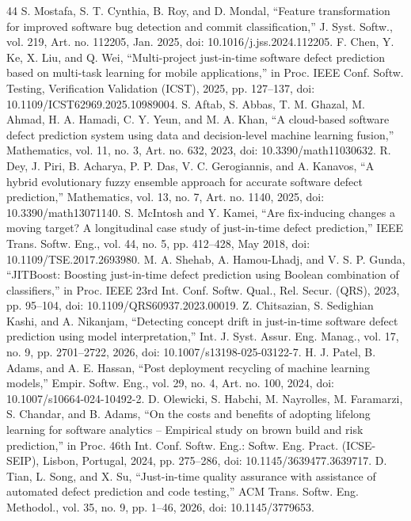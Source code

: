 \begin{thebibliography}{44}
 S. Mostafa, S. T. Cynthia, B. Roy, and D. Mondal, ``Feature transformation for improved software bug detection and commit classification,'' J. Syst. Softw., vol. 219, Art. no. 112205, Jan. 2025, doi: \mbox{10.1016/j.jss.2024.112205}.
 F. Chen, Y. Ke, X. Liu, and Q. Wei, ``Multi-project just-in-time software defect prediction based on multi-task learning for mobile applications,'' in Proc. IEEE Conf. Softw. Testing, Verification Validation (ICST), 2025, pp. 127--137, doi: \mbox{10.1109/ICST62969.2025.10989004}.
 S. Aftab, S. Abbas, T. M. Ghazal, M. Ahmad, H. A. Hamadi, C. Y. Yeun, and M. A. Khan, ``A cloud-based software defect prediction system using data and decision-level machine learning fusion,'' Mathematics, vol. 11, no. 3, Art. no. 632, 2023, doi: \mbox{10.3390/math11030632}.
 R. Dey, J. Piri, B. Acharya, P. P. Das, V. C. Gerogiannis, and A. Kanavos, ``A hybrid evolutionary fuzzy ensemble approach for accurate software defect prediction,'' Mathematics, vol. 13, no. 7, Art. no. 1140, 2025, doi: \mbox{10.3390/math13071140}.
 S. McIntosh and Y. Kamei, ``Are fix-inducing changes a moving target? A longitudinal case study of just-in-time defect prediction,'' IEEE Trans. Softw. Eng., vol. 44, no. 5, pp. 412--428, May 2018, doi: \mbox{10.1109/TSE.2017.2693980}.
 M. A. Shehab, A. Hamou-Lhadj, and V. S. P. Gunda, ``JITBoost: Boosting just-in-time defect prediction using Boolean combination of classifiers,'' in Proc. IEEE 23rd Int. Conf. Softw. Qual., Rel. Secur. (QRS), 2023, pp. 95--104, doi: \mbox{10.1109/QRS60937.2023.00019}.
 Z. Chitsazian, S. Sedighian Kashi, and A. Nikanjam, ``Detecting concept drift in just-in-time software defect prediction using model interpretation,'' Int. J. Syst. Assur. Eng. Manag., vol. 17, no. 9, pp. 2701--2722, 2026, doi: \mbox{10.1007/s13198-025-03122-7}.
 H. J. Patel, B. Adams, and A. E. Hassan, ``Post deployment recycling of machine learning models,'' Empir. Softw. Eng., vol. 29, no. 4, Art. no. 100, 2024, doi: \mbox{10.1007/s10664-024-10492-2}.
 D. Olewicki, S. Habchi, M. Nayrolles, M. Faramarzi, S. Chandar, and B. Adams, ``On the costs and benefits of adopting lifelong learning for software analytics -- Empirical study on brown build and risk prediction,'' in Proc. 46th Int. Conf. Softw. Eng.: Softw. Eng. Pract. (ICSE-SEIP), Lisbon, Portugal, 2024, pp. 275--286, doi: \mbox{10.1145/3639477.3639717}.
 D. Tian, L. Song, and X. Su, ``Just-in-time quality assurance with assistance of automated defect prediction and code testing,'' ACM Trans. Softw. Eng. Methodol., vol. 35, no. 9, pp. 1--46, 2026, doi: \mbox{10.1145/3779653}.

\end{thebibliography}
